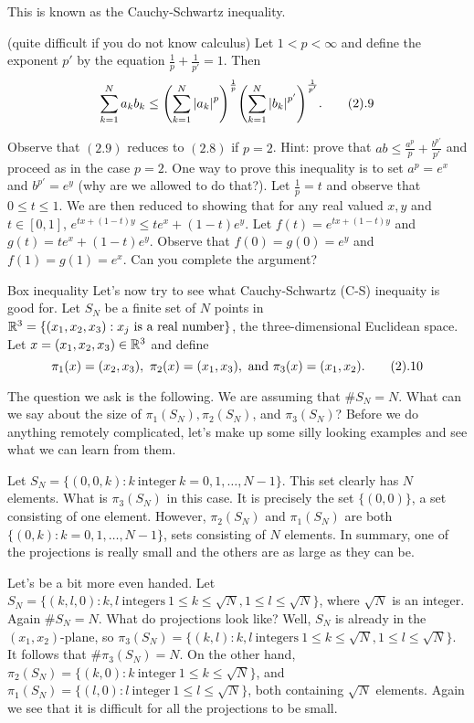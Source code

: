 This is known as the Cauchy-Schwartz inequality.

 (quite difficult if you do not know calculus) Let
$1<p<\infty$ and define the exponent $p'$ by
the equation $\frac{1}{p}+\frac{1}{p'}=1$. Then
$$ \sum_{k=1}^N a_k b_k \leq {\left(\sum_{k=1}^N {|a_k|}^p
\right)}^{\frac{1}{p}} {\left(\sum_{k=1}^N {|b_k|}^{p'}
\right)}^{\frac{1}{p'}}. \tag2.9$$

Observe that $(2.9)$ reduces to $(2.8)$ if $p=2$. Hint: prove that
$ab \leq \frac{a^p}{p}+\frac{b^{p'}}{p'}$ and proceed as in the
case $p=2$. One way to prove this inequality is to set $a^p=e^x$
and $b^{p'}=e^y$ (why are we allowed to do that?). Let
$\frac{1}{p}=t$ and observe that $0 \leq t \leq 1$. We are then
reduced to showing that for any real valued $x,y$ and $t \in
[0,1]$, $e^{tx+(1-t)y} \leq te^x+(1-t)e^y$. Let
$f(t)=e^{tx+(1-t)y}$ and $g(t)=te^x+(1-t)e^y$. Observe that
$f(0)=g(0)=e^y$ and $f(1)=g(1)=e^x$. Can you complete the
argument?

\endproclaim

\subhead Box inequality \endsubhead Let's now try to see what
Cauchy-Schwartz (C-S) inequaity is good for. Let $S_N$ be a finite set of
$N$ points in ${\Bbb R}^3=\{(x_1,x_2,x_3): x_j \ \text{is a real
number}\}$, the three-dimensional Euclidean space. Let $x=(x_1,x_2,x_3)
\in {\Bbb R}^3$ and define
$$ \pi_1(x)=(x_2,x_3), \ \pi_2(x)=(x_1,x_3), \ \text{and} \
\pi_3(x)=(x_1,x_2). \tag2.10$$

The question we ask is the following. We are assuming that $\# S_N=N$.
What can we say about the size of $\pi_1(S_N), \pi_2(S_N)$, and
$\pi_3(S_N)$? Before we do anything remotely complicated, let's make up
some silly looking examples and see what we can learn from them.

Let $S_N=\{(0,0,k): k \ \text{integer} \ k=0,1, \dots, N-1\}$. This set
clearly has $N$ elements. What is $\pi_3(S_N)$ in this case. It is
precisely the set $\{(0,0)\}$, a set consisting of one element. However,
$\pi_2(S_N)$ and $\pi_1(S_N)$ are both $\{(0,k): k=0,1,\dots,N-1\}$,
sets consisting of $N$ elements. In summary, one of the projections is
really small and the others are as large as they can be.

Let's be a bit more even handed. Let $S_N=\{(k,l,0): k,l \
\text{integers} \ 1 \leq k \leq \sqrt{N}, 1 \leq l \leq \sqrt{N}\}$, where
$\sqrt{N}$ is an integer. Again $\# S_N=N$. What do projections look
like? Well, $S_N$ is already in the $(x_1,x_2)$-plane, so
$\pi_3(S_N)=\{(k,l): k,l \
\text{integers} \ 1 \leq k \leq \sqrt{N}, 1 \leq l \leq \sqrt{N}\}$. It
follows that $\# \pi_3(S_N)=N$. On the other hand, $\pi_2(S_N)=\{(k,0):
k \ \text{integer} \ 1 \leq k \leq \sqrt{N} \}$, and
$\pi_1(S_N)=\{(l,0): l \ \text{integer} \ 1 \leq l \leq \sqrt{N} \}$,
both containing $\sqrt{N}$ elements. Again we see that it is difficult for
all the projections to be small.

